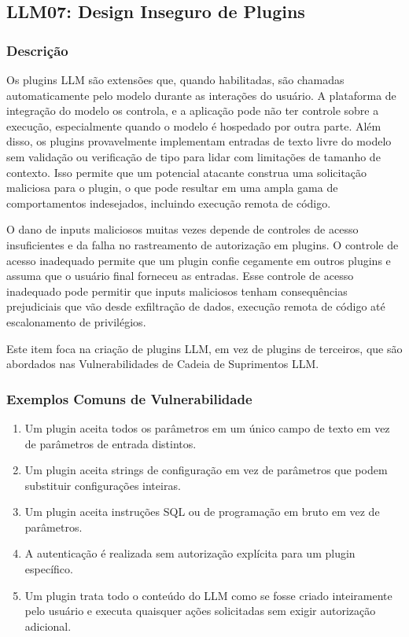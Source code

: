 \documentclass[
]{article}
\author{}
\date{}
\providecommand{\tightlist}{%
  \setlength{\itemsep}{0pt}\setlength{\parskip}{0pt}}
\begin{document}
\subsection{LLM07: Design Inseguro de
Plugins}\label{llm07-design-inseguro-de-plugins}

\subsubsection{Descrição}\label{descriuxe7uxe3o}

Os plugins LLM são extensões que, quando habilitadas, são chamadas
automaticamente pelo modelo durante as interações do usuário. A
plataforma de integração do modelo os controla, e a aplicação pode não
ter controle sobre a execução, especialmente quando o modelo é hospedado
por outra parte. Além disso, os plugins provavelmente implementam
entradas de texto livre do modelo sem validação ou verificação de tipo
para lidar com limitações de tamanho de contexto. Isso permite que um
potencial atacante construa uma solicitação maliciosa para o plugin, o
que pode resultar em uma ampla gama de comportamentos indesejados,
incluindo execução remota de código.

O dano de inputs maliciosos muitas vezes depende de controles de acesso
insuficientes e da falha no rastreamento de autorização em plugins. O
controle de acesso inadequado permite que um plugin confie cegamente em
outros plugins e assuma que o usuário final forneceu as entradas. Esse
controle de acesso inadequado pode permitir que inputs maliciosos tenham
consequências prejudiciais que vão desde exfiltração de dados, execução
remota de código até escalonamento de privilégios.

Este item foca na criação de plugins LLM, em vez de plugins de
terceiros, que são abordados nas Vulnerabilidades de Cadeia de
Suprimentos LLM.

\subsubsection{Exemplos Comuns de
Vulnerabilidade}\label{exemplos-comuns-de-vulnerabilidade}

\begin{enumerate}
\def\labelenumi{\arabic{enumi}.}
\tightlist
\item
  Um plugin aceita todos os parâmetros em um único campo de texto em vez
  de parâmetros de entrada distintos.
\item
  Um plugin aceita strings de configuração em vez de parâmetros que
  podem substituir configurações inteiras.
\item
  Um plugin aceita instruções SQL ou de programação em bruto em vez de
  parâmetros.
\item
  A autenticação é realizada sem autorização explícita para um plugin
  específico.
\item
  Um plugin trata todo o conteúdo do LLM como se fosse criado
  inteiramente pelo usuário e executa quaisquer ações solicitadas sem
  exigir autorização adicional.
\end{enumerate}
\end{document}
